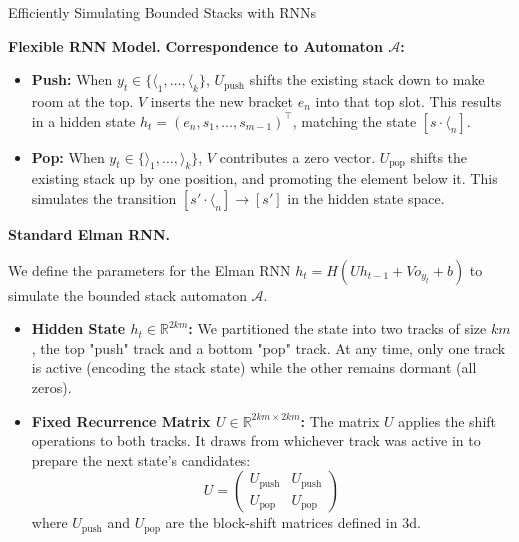 \begin{question}{Efficiently Simulating Bounded Stacks with RNNs}
\begin{subquestion}{\textbf{Flexible RNN Model.}}
\textbf{Correspondence to Automaton $\mathcal{A}$:}
\begin{itemize}
    \item \textbf{Push:} When $y_t \in \{ \langle_1, \dots, \langle_k \}$, $U_{\text{push}}$ shifts the existing stack down to make room at the top. $V$ inserts the new bracket $e_n$ into that top slot. This results in a hidden state $h_t = (e_n, s_1, \dots, s_{m-1})^\top$, matching the state $[s \cdot \langle_n]$.
    \item \textbf{Pop:} When $y_t \in \{ \rangle_1, \dots, \rangle_k \}$, $V$ contributes a zero vector. $U_{\text{pop}}$ shifts the existing stack up by one position, and promoting the element below it. This simulates the transition $[s' \cdot \langle_n] \to [s']$ in the hidden state space.
\end{itemize}

\end{subquestion}

\begin{subquestion}{\textbf{Standard Elman RNN.}}

We define the parameters for the Elman RNN $h_t = H(Uh_{t-1} + Vo_{y_t} + b)$ to simulate the bounded stack automaton $\mathcal{A}$.

\begin{itemize}
    \item \textbf{Hidden State $h_t \in \mathbb{R}^{2km}$:} 
    We partitioned the state into two tracks of size $km$, the top "push" track and a bottom "pop" track. At any time, only one track is active (encoding the stack state) while the other remains dormant (all zeros).

    \item \textbf{Fixed Recurrence Matrix $U \in \mathbb{R}^{2km \times 2km}$:} 
    The matrix $U$ applies the shift operations to both tracks. It draws from whichever track was active in to prepare the next state's candidates:
    \[
    U = \begin{pmatrix}
        U_{\text{push}} & U_{\text{push}} \\
        U_{\text{pop}} & U_{\text{pop}}
    \end{pmatrix}
    \]
    where $U_{\text{push}}$ and $U_{\text{pop}}$ are the block-shift matrices defined in 3d.


\end{itemize}
\end{subquestion}
\end{question}
